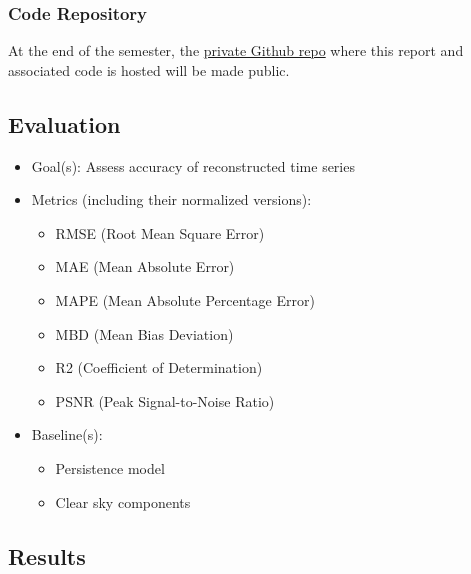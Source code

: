 \begin{multicols}{2}
\subsubsection{Code Repository}

At the end of the semester, the \href{https://github.com/avega17/CCOM_MS_Spring_2025_EO_PV_research}{private Github repo} where this report and associated code is hosted will be made public.

\subsection{Evaluation}
    \begin{itemize}
        \item Goal(s): Assess accuracy of reconstructed time series 
        \item Metrics (including their normalized versions):
        \begin{itemize}
            \item RMSE (Root Mean Square Error)
            \item MAE (Mean Absolute Error)
            \item MAPE (Mean Absolute Percentage Error)
            \item MBD (Mean Bias Deviation)
            \item R2 (Coefficient of Determination)
            \item PSNR (Peak Signal-to-Noise Ratio)
        \end{itemize}
        \item Baseline(s):
            \begin{itemize}
                \item Persistence model 
                \item Clear sky components
            \end{itemize}
    \end{itemize}

\subsection{Results}

\end{multicols}
\bigskip